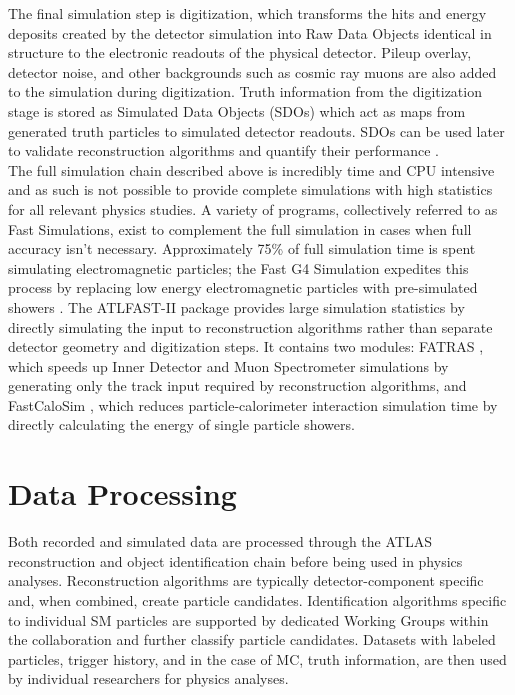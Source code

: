 The final simulation step is digitization, which transforms the hits and energy deposits created by the detector simulation into Raw Data Objects identical in structure to the electronic readouts of the physical detector. Pileup overlay, detector noise, and other backgrounds such as cosmic ray muons are also added to the simulation during digitization. Truth information from the digitization stage is stored as Simulated Data Objects (SDOs) which act as maps from generated truth particles to simulated detector readouts. SDOs can be used later to validate reconstruction algorithms and quantify their performance \cite{sim_paper}.\\

The full simulation chain described above is incredibly time and CPU intensive and as such is not possible to provide complete simulations with high statistics for all relevant physics studies. A variety of programs, collectively referred to as Fast Simulations, exist to complement the full simulation in cases when full accuracy isn't necessary. Approximately 75\% of full simulation time is spent simulating electromagnetic particles; the Fast G4 Simulation expedites this process by replacing low energy electromagnetic particles with pre-simulated showers \cite{g4_sim}. The ATLFAST-II package provides large simulation statistics by directly simulating the input to reconstruction algorithms rather than separate detector geometry and digitization steps. It contains two modules: FATRAS \cite{fatras}, which speeds up Inner Detector and Muon Spectrometer simulations by generating only the track input required by reconstruction algorithms, and FastCaloSim \cite{fastcalo}, which reduces particle-calorimeter interaction simulation time by directly calculating the energy of single particle showers. 

\section{Data Processing}\label{sec:data_proc}
Both recorded and simulated data are processed through the ATLAS reconstruction and object identification chain before being used in physics analyses. Reconstruction algorithms are typically detector-component specific and, when combined, create particle candidates. Identification algorithms specific to individual SM particles are supported by dedicated Working Groups within the collaboration and further classify particle candidates. Datasets with labeled particles, trigger history, and in the case of MC, truth information, are then used by individual researchers for physics analyses.


